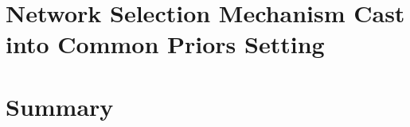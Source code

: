 


\section{Network Selection Mechanism Cast into Common Priors Setting} %
\label{sec:network_selection_mechanism_cast_into_common_priors_setting}


\section{Summary} %
\label{sec:summary_approximation}

